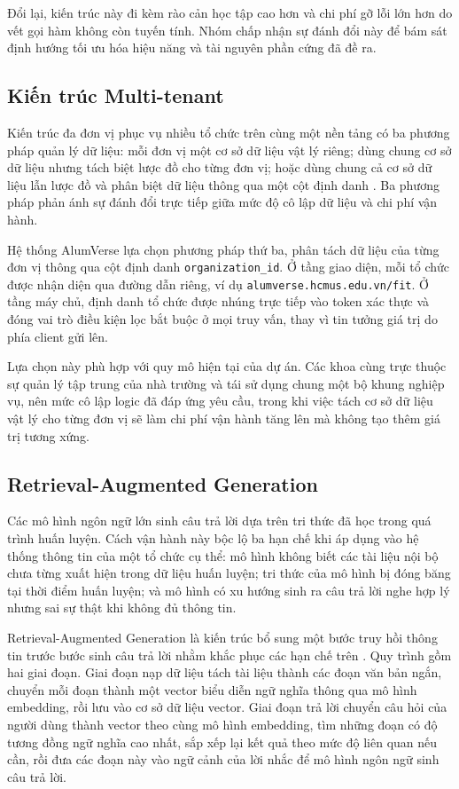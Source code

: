 \documentclass[12pt,a4paper,oneside]{report}
\begin{document}
Đổi lại, kiến trúc này đi kèm rào cản học tập cao hơn và chi phí gỡ lỗi lớn hơn do vết gọi hàm không còn tuyến tính. Nhóm chấp nhận sự đánh đổi này để bám sát định hướng tối ưu hóa hiệu năng và tài nguyên phần cứng đã đề ra.

\subsection{Kiến trúc Multi-tenant}

Kiến trúc đa đơn vị phục vụ nhiều tổ chức trên cùng một nền tảng có ba phương pháp quản lý dữ liệu: mỗi đơn vị một cơ sở dữ liệu vật lý riêng; dùng chung cơ sở dữ liệu nhưng tách biệt lược đồ cho từng đơn vị; hoặc dùng chung cả cơ sở dữ liệu lẫn lược đồ và phân biệt dữ liệu thông qua một cột định danh \cite{multitenant}. Ba phương pháp phản ánh sự đánh đổi trực tiếp giữa mức độ cô lập dữ liệu và chi phí vận hành.

Hệ thống AlumVerse lựa chọn phương pháp thứ ba, phân tách dữ liệu của từng đơn vị thông qua cột định danh \texttt{organization\_id}. Ở tầng giao diện, mỗi tổ chức được nhận diện qua đường dẫn riêng, ví dụ \texttt{alumverse.hcmus.edu.vn/fit}. Ở tầng máy chủ, định danh tổ chức được nhúng trực tiếp vào token xác thực và đóng vai trò điều kiện lọc bắt buộc ở mọi truy vấn, thay vì tin tưởng giá trị do phía client gửi lên.

Lựa chọn này phù hợp với quy mô hiện tại của dự án. Các khoa cùng trực thuộc sự quản lý tập trung của nhà trường và tái sử dụng chung một bộ khung nghiệp vụ, nên mức cô lập logic đã đáp ứng yêu cầu, trong khi việc tách cơ sở dữ liệu vật lý cho từng đơn vị sẽ làm chi phí vận hành tăng lên mà không tạo thêm giá trị tương xứng.

\subsection{Retrieval-Augmented Generation}
\label{subsec:rag}

Các mô hình ngôn ngữ lớn sinh câu trả lời dựa trên tri thức đã học trong quá trình huấn luyện. Cách vận hành này bộc lộ ba hạn chế khi áp dụng vào hệ thống thông tin của một tổ chức cụ thể: mô hình không biết các tài liệu nội bộ chưa từng xuất hiện trong dữ liệu huấn luyện; tri thức của mô hình bị đóng băng tại thời điểm huấn luyện; và mô hình có xu hướng sinh ra câu trả lời nghe hợp lý nhưng sai sự thật khi không đủ thông tin.

Retrieval-Augmented Generation là kiến trúc bổ sung một bước truy hồi thông tin trước bước sinh câu trả lời nhằm khắc phục các hạn chế trên \cite{rag}. Quy trình gồm hai giai đoạn. Giai đoạn nạp dữ liệu tách tài liệu thành các đoạn văn bản ngắn, chuyển mỗi đoạn thành một vector biểu diễn ngữ nghĩa thông qua mô hình embedding, rồi lưu vào cơ sở dữ liệu vector. Giai đoạn trả lời chuyển câu hỏi của người dùng thành vector theo cùng mô hình embedding, tìm những đoạn có độ tương đồng ngữ nghĩa cao nhất, sắp xếp lại kết quả theo mức độ liên quan nếu cần, rồi đưa các đoạn này vào ngữ cảnh của lời nhắc để mô hình ngôn ngữ sinh câu trả lời.
\end{document}

